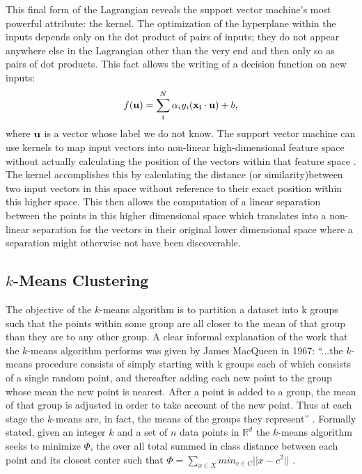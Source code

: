 This final form of the Lagrangian reveals the support vector machine's most
powerful attribute: the kernel. The optimization of the hyperplane within the
inputs depends only on the dot product of pairs of inputs; they do not appear
anywhere else in the Lagrangian other than the very end and then only so as
pairs of dot products. This fact allows the writing of a decision function on
new inputs: $$f(\bold{u}) = \sum_{i}^{N}\alpha_{i}y_{i}(\bold{x_i}\cdot\bold{u})+b,$$
where $\bold{u}$ is a vector whose label we do not know. The support vector
machine can use kernels to map input vectors into
non-linear high-dimensional feature space without actually calculating the
position of the vectors within that feature space \cite{Vapnik}. The kernel
accomplishes this by calculating the distance (or similarity)between two
input vectors in this space without reference to their exact position within
this higher space. This then allows the computation of a linear separation
between the points in this higher dimensional space which translates into a
non-linear separation for the vectors in their original lower dimensional space
where a separation might otherwise not have been discoverable.
\subsection{$k$-Means Clustering}
The objective of the $k$-means algorithm is to partition a dataset into k groups
such that the points within some group are all closer to
the mean of that group than they are to any other group. A clear
informal explanation of the work that the $k$-means algorithm performs
was given by James MacQueen in 1967: ``...the $k$-means procedure
consists of simply starting with k groups each of which consists of a
single random point, and thereafter adding each new point to the
group whose mean the new point is nearest. After a point is added to
a group, the mean of that group is adjusted in order to take account
of the new point. Thus at each stage the $k$-means are, in fact, the
means of the groups they represent'' \cite{MacQueen}. Formally stated,
given an integer $k$ and a set of $n$ data points in
$\mathbb{R}^{d}$ the $k$-means algorithm seeks to minimize $\Phi$, the
over all total summed in class distance between each point and its
closest center such that $\Phi = \sum_{x \in X} min_{c \in C}||{x-c^{2}}||$
\cite{Arthur}.

